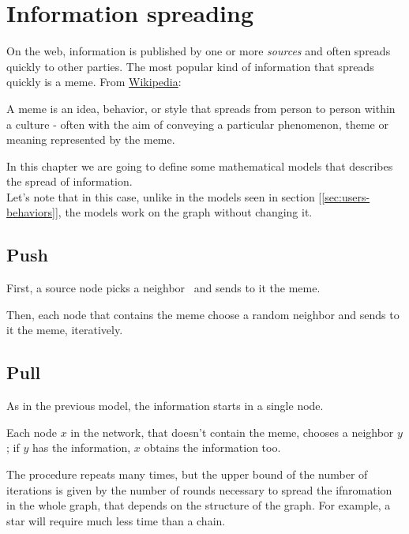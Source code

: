 \chapter[Information spreading]{Information spreading \raisebox{.3\baselineskip}{\normalsize\footnotemark}}

On the web, information is published by one or more \emph{sources} and often spreads quickly to other parties. The most popular kind of information that spreads quickly is a meme. From \href{https://en.wikipedia.org/wiki/Meme}{Wikipedia}:

\begin{defn}[Meme]
	A meme is an idea, behavior, or style that spreads from person to person within a culture - often with the aim of conveying a particular phenomenon, theme or meaning represented by the meme.
\end{defn}

In this chapter we are going to define some mathematical models that describes the spread of information.\\
Let's note that in this case, unlike in the models seen in section [\ref{sec:users-behaviors}], the models work on the graph without changing it.

\section{Push}

First, a source node picks a neighbor \uar\ and sends to it the meme.

Then, each node that contains the meme choose a random neighbor and sends to it the meme, iteratively.


\section{Pull}

As in the previous model, the information starts in a single node.

Each node $x$ in the network, that doesn't contain the meme, chooses a neighbor $y$ \uar; if $y$ has the information, $x$ obtains the information too.

The procedure repeats many times, but the upper bound of the number of iterations is given by the number of rounds necessary to spread the ifnromation in the whole graph, that depends on the structure of the graph. For example, a star will require much less time than a chain.


